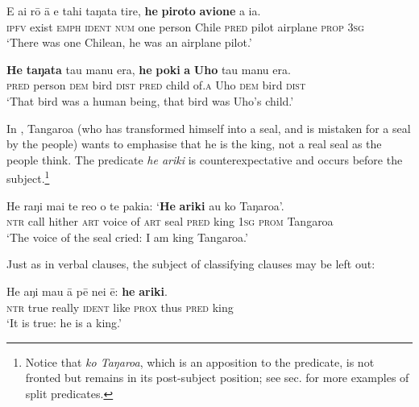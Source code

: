 \ea\label{ex:9.4}
\gll E ai rō {\ꞌ}ā e tahi taŋata tire, \textbf{he} \textbf{piroto} \textbf{{\ꞌ}avione} a ia. \\
\textsc{ipfv} exist \textsc{emph} \textsc{ident} \textsc{num} one person Chile \textsc{pred} pilot airplane \textsc{prop} \textsc{3sg} \\

\glt 
‘There was one Chilean, he was an airplane pilot.’ \textstyleExampleref{[R378.013]} 
\z

\ea\label{ex:9.5}
\gll \textbf{He} \textbf{taŋata} tau manu era, \textbf{he} \textbf{poki} \textbf{{\ꞌ}a} \textbf{Uho} tau manu era. \\
\textsc{pred} person \textsc{dem} bird \textsc{dist} \textsc{pred} child of\textsc{.a} Uho \textsc{dem} bird \textsc{dist} \\

\glt
‘That bird was a human being, that bird was Uho’s child.’ \textstyleExampleref{[Mtx-7-12.069]}
\z

In , Tangaroa (who has transformed himself into a seal, and is mistaken for a seal by the people) wants to emphasise that he is the king, not a real seal as the people think. The predicate \textit{he {\ꞌ}ariki} is counterexpectative and occurs before the subject.\footnote{\label{fn:460}Notice that \textit{ko Taŋaroa}, which is an apposition to the predicate, is not fronted but remains in its post-subject position; see sec.  for more examples of split predicates.} 

\ea\label{ex:9.6}
\gll He raŋi mai te re{\ꞌ}o o te pakia: ‘\textbf{He} \textbf{{\ꞌ}ariki} au ko Taŋaroa’. \\
\textsc{ntr} call hither \textsc{art} voice of \textsc{art} seal \textsc{pred} king \textsc{1sg} \textsc{prom} Tangaroa \\

\glt 
‘The voice of the seal cried: I am king Tangaroa.’ \textstyleExampleref{[Mtx-1-05.008]}
\z

Just as in verbal clauses, the subject of classifying clauses may be left out:

\ea\label{ex:9.7}
\gll He aŋi mau {\ꞌ}ā pē nei ē: \textbf{he} \textbf{{\ꞌ}ariki}. \\
\textsc{ntr} true really \textsc{ident} like \textsc{prox} thus \textsc{pred} king \\

\glt 
‘It is true: he is a king.’ \textstyleExampleref{[Fel-46.053]}
\z

